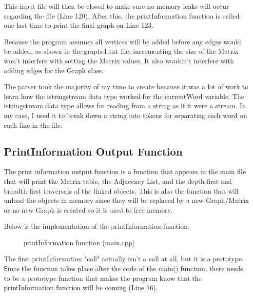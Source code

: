 \documentclass[letterpaper, 10pt]{article}
\begin{document}
\noindent
This input file will then be closed to make sure no memory leaks will occur regarding the file (Line 120). After this, the printInformation function is called one last time to print the final graph on Line 123. 

\vspace{0.5em}
\noindent
Because the program assumes all vertices will be added before any edges would be added, as shown in the graphs1.txt file, incrementing the size of the Matrix won't interfere with setting the Matrix values. It also wouldn't interfere with adding edges for the Graph class.

\vspace{0.5em}
\noindent
The parser took the majority of my time to create because it was a lot of work to learn how the istringstream data type worked for the currentWord variable. The istringstream data type allows for reading from a string as if it were a stream. In my case, I used it to break down a string into tokens for separating each word on each line in the file.

\subsection{PrintInformation Output Function}
\noindent
The print information output function is a function that appears in the main file that will print the Matrix table, the Adjacency List, and the depth-first and breadth-first traversals of the linked objects. This is also the function that will unload the objects in memory since they will be replaced by a new Graph/Matrix or no new Graph is created so it is used to free memory. 

\vspace{1em}
\noindent
Below is the implementation of the printInformation function.

\begin{figure}[H]
  \centering
   
  \label{fig:figure2.3-part1}
\end{figure}

\vspace{-2em}

\begin{figure}[H]
  \centering
   
  \caption{printInformation function (main.cpp)}
  \label{fig:figure2.3-part2}
\end{figure}

\noindent
The first printInformation "call" actually isn't a call at all, but it is a prototype. Since the function takes place after the code of the main() function, there needs to be a prototype function that makes the program know that the printInformation function will be coming (Line 16).
\end{document}
